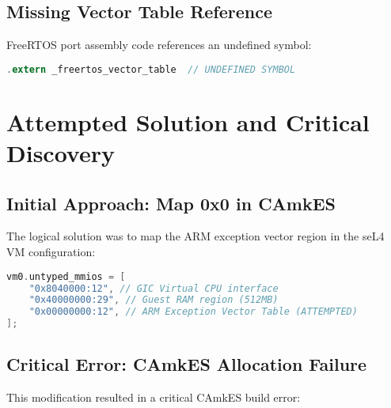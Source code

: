 \documentclass[11pt,a4paper]{article}
\begin{document}
\subsection{Missing Vector Table Reference}

FreeRTOS port assembly code references an undefined symbol:

\begin{lstlisting}[language=C,caption=FreeRTOS portASM.S]
.extern _freertos_vector_table  // UNDEFINED SYMBOL
\end{lstlisting}

\section{Attempted Solution and Critical Discovery}

\subsection{Initial Approach: Map 0x0 in CAmkES}

The logical solution was to map the ARM exception vector region in the seL4 VM configuration:

\begin{lstlisting}[language=C,caption=Attempted devices.camkes Modification]
vm0.untyped_mmios = [
    "0x8040000:12", // GIC Virtual CPU interface
    "0x40000000:29", // Guest RAM region (512MB) 
    "0x00000000:12", // ARM Exception Vector Table (ATTEMPTED)
];
\end{lstlisting}

\subsection{Critical Error: CAmkES Allocation Failure}

This modification resulted in a critical CAmkES build error:
\end{document}
